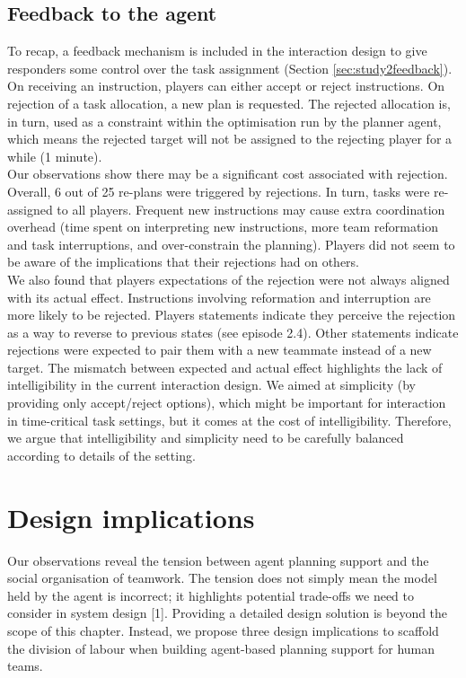 \subsection{Feedback to the agent}\label{sec:studytwofeedback}

To recap, a feedback mechanism is included in the interaction design to give responders some control over the task assignment (Section \ref{sec:study2feedback}). On receiving an instruction, players can either accept or reject instructions. On rejection of a task allocation, a new plan is requested. The rejected allocation is, in turn, used as a constraint within the optimisation run by the planner agent, which means the rejected target will not be assigned to the rejecting player for a while (1 minute). \\

Our observations show there may be a significant cost associated with rejection. Overall, 6 out of 25 re-plans were triggered by rejections. In turn, tasks were re-assigned to all players. Frequent new instructions may cause extra coordination overhead (time spent on interpreting new instructions, more team reformation and task interruptions, and over-constrain the planning). Players did not seem to be aware of the implications that their rejections had on others.\\
 
We also found that players expectations of the rejection were not always aligned with its actual effect. Instructions involving reformation and interruption are more likely to be rejected. Players statements indicate they perceive the rejection as a way to reverse to previous states (see episode 2.4). Other statements indicate rejections were expected to pair them with a new teammate instead of a new target. The mismatch between expected and actual effect highlights the lack of intelligibility in the current interaction design. We aimed at simplicity (by providing only accept/reject options), which might be important for interaction in time-critical task settings, but it comes at the cost of intelligibility. Therefore, we argue that intelligibility and simplicity need to be carefully balanced according to details of the setting.\\


\section{Design implications}

Our observations reveal the tension between agent planning support and the social organisation of teamwork. The tension does not simply mean the model held by the agent is incorrect; it highlights potential trade-offs we need to consider in system design [1]. Providing a detailed design solution is beyond the scope of this chapter. Instead, we propose three design implications to scaffold the division of labour when building agent-based planning support for human teams.\\

